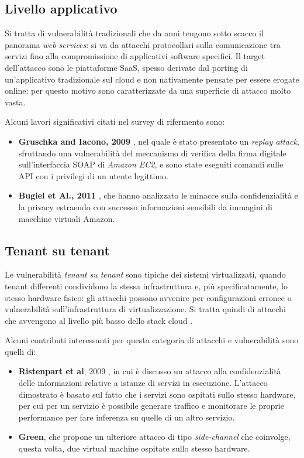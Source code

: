 \documentclass[../main.tex]{subfiles}
\begin{document}
\subsection{Livello applicativo}
Si tratta di vulnerabilità tradizionali che da anni tengono sotto scacco il panorama \textit{web services}: si va da attacchi protocollari sulla comunicazione tra servizi fino alla compromissione di applicativi software specifici. Il target dell'attacco sono le piattaforme SaaS, spesso derivate dal porting di un'applicativo tradizionale sul cloud e non nativamente pensate per essere erogate online: per questo motivo sono caratterizzate da una superficie di attacco molto vasta.

Alcuni lavori significativi citati nel survey di rifermento \cite{Ardagna:2015:SAC:2808687.2767005} sono:
\begin{itemize}
    \item \textbf{Gruschka and Iacono, 2009} \cite{Ieee5175877}, nel quale è stato presentato un \textit{replay attack}, sfruttando una vulnerabilità del meccanismo di verifica della firma digitale sull'interfaccia SOAP di \textit{Amazon EC2}, e sono state eseguiti comandi sulle API con i privilegi di un utente legittimo.
    \item \textbf{Bugiel et Al., 2011} \cite{Bugiel:2011:AES:2046707.2046753}, che hanno analizzato le minacce sulla confidenzialità e la privacy estraendo con successo informazioni sensibili da immagini di macchine virtuali Amazon.
\end{itemize} 

\subsection{Tenant su tenant}
Le vulnerabilità \textit{tenant su tenant} sono tipiche dei sistemi virtualizzati, quando tenant differenti condividono la stessa infrastruttura e, più specificatamente, lo stesso hardware fisico: gli attacchi possono avvenire per configurazioni erronee o vulnerabilità sull'infrastruttura di virtualizzazione. Si tratta quindi di attacchi che avvengono al livello più basso dello stack cloud \cite{Ardagna:2015:SAC:2808687.2767005}.

Alcuni contributi interessanti per questa categoria di attacchi e vulnerabilità sono quelli di:

\begin{itemize}
    \item \textbf{Ristenpart et al}, 2009 \cite{Ristenpart:2009:HYG:1653662.1653687}, in cui è discusso un attacco alla confidenzialità delle informazioni relative a istanze di servizi in esecuzione. L'attacco dimostrato è basato sul fatto che i servizi sono ospitati sullo stesso hardware, per cui per un servizio è possibile generare traffico e monitorare le proprie performance per fare inferenza su quelle di un altro servizio.
	\item \textbf{Green}\cite{Ieee6427814}, che propone un ulteriore attacco di tipo \textit{side-channel} che coinvolge, questa volta, due virtual machine ospitate sullo stesso hardware.
\end{itemize}
\end{document}
